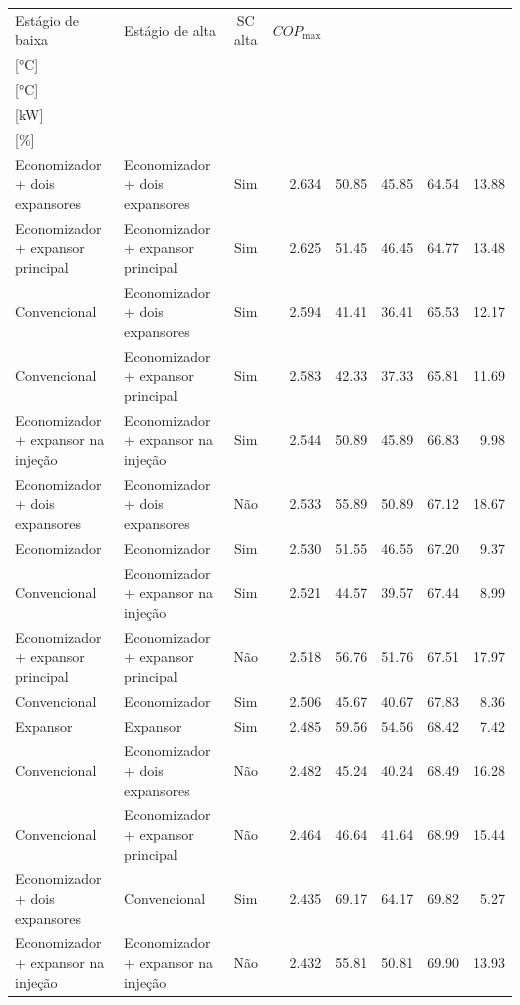 {\small\setlength{\tabcolsep}{4pt}\renewcommand{\arraystretch}{1.12}
\begin{tabular}{llcrrrrr}
\toprule
Estágio de baixa & Estágio de alta & SC alta & $COP_{\max}$ & \shortstack{$T_{\mathrm{cond,l}}^*$\\{[°C]}} & \shortstack{$T_{\mathrm{evap,h}}^*$\\{[°C]}} & \shortstack{$\dot W_{\mathrm{liq}}$\\{[kW]}} & \shortstack{$\Delta COP_{\mathrm{opt}}$\\{[\%]}} \\
\midrule
Economizador + dois expansores & Economizador + dois expansores & Sim & 2.634 & 50.85 & 45.85 & 64.54 & 13.88 \\
Economizador + expansor principal & Economizador + expansor principal & Sim & 2.625 & 51.45 & 46.45 & 64.77 & 13.48 \\
Convencional & Economizador + dois expansores & Sim & 2.594 & 41.41 & 36.41 & 65.53 & 12.17 \\
Convencional & Economizador + expansor principal & Sim & 2.583 & 42.33 & 37.33 & 65.81 & 11.69 \\
Economizador + expansor na injeção & Economizador + expansor na injeção & Sim & 2.544 & 50.89 & 45.89 & 66.83 & 9.98 \\
Economizador + dois expansores & Economizador + dois expansores & Não & 2.533 & 55.89 & 50.89 & 67.12 & 18.67 \\
Economizador & Economizador & Sim & 2.530 & 51.55 & 46.55 & 67.20 & 9.37 \\
Convencional & Economizador + expansor na injeção & Sim & 2.521 & 44.57 & 39.57 & 67.44 & 8.99 \\
Economizador + expansor principal & Economizador + expansor principal & Não & 2.518 & 56.76 & 51.76 & 67.51 & 17.97 \\
Convencional & Economizador & Sim & 2.506 & 45.67 & 40.67 & 67.83 & 8.36 \\
Expansor & Expansor & Sim & 2.485 & 59.56 & 54.56 & 68.42 & 7.42 \\
Convencional & Economizador + dois expansores & Não & 2.482 & 45.24 & 40.24 & 68.49 & 16.28 \\
Convencional & Economizador + expansor principal & Não & 2.464 & 46.64 & 41.64 & 68.99 & 15.44 \\
Economizador + dois expansores & Convencional & Sim & 2.435 & 69.17 & 64.17 & 69.82 & 5.27 \\
Economizador + expansor na injeção & Economizador + expansor na injeção & Não & 2.432 & 55.81 & 50.81 & 69.90 & 13.93 \\

\end{tabular}}
